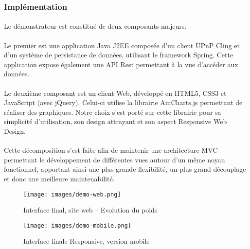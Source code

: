 \documentclass[nocopyrightspace]{sigplanconf}
\begin{document}
		\subsubsection{Implémentation}

			\paragraph{}
			Le démonstrateur est constitué de deux composants majeurs. 

			\paragraph{}
			Le premier est une application Java J2EE\cite{j2ee} composée d’un client UPnP Cling et d’un système de persistance de données, utilisant le framework Spring\cite{spring}. Cette application expose également une API Rest permettant à la vue d’accéder aux données.

			\paragraph{}
			Le deuxième composant est un client Web, développé en HTML5, CSS3 et JavaScript (avec jQuery\cite{jquery}). Celui-ci utilise la librairie AmCharts.js\cite{amcharts} permettant de réaliser des graphiques. Notre choix s’est porté sur cette librairie pour sa simplicité d’utilisation, son design attrayant et son aspect Responsive Web Design.

			\paragraph{}
			Cette décomposition s’est faite afin de maintenir une architecture MVC\cite{mvc} permettant le développement de différentes vues autour d’un même noyau fonctionnel, apportant ainsi une plus grande flexibilité, un plus grand découplage et donc une meilleure maintenabilité.

			\begin{figure}[h]
				\centering
				\texttt{[image: images/demo-web.png]}
				\caption{Interface final, site web  – Evolution du poids}
			\end{figure}

			\begin{figure}[h]
				\centering
				\texttt{[image: images/demo-mobile.png]}
				\caption{Interface finale Responsive, version mobile}
			\end{figure}
\end{document}
